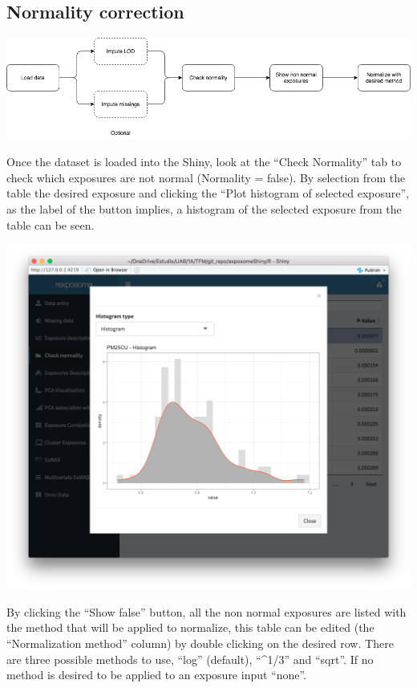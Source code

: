 \documentclass[
]{book}
\begin{document}
\hypertarget{normality-correction}{%
\subsection{Normality correction}\label{normality-correction}}

\includegraphics{images/analysis3_1.png}

Once the dataset is loaded into the Shiny, look at the ``Check Normality'' tab to check which exposures are not normal (Normality = false). By selection from the table the desired exposure and clicking the ``Plot histogram of selected exposure'', as the label of the button implies, a histogram of the selected exposure from the table can be seen.

\includegraphics{images/analysis3_2.png}

By clicking the ``Show false'' button, all the non normal exposures are listed with the method that will be applied to normalize, this table can be edited (the ``Normalization method'' column) by double clicking on the desired row. There are three possible methods to use, ``log'' (default), ``\^{}1/3'' and ``sqrt''. If no method is desired to be applied to an exposure input ``none''.
\end{document}
